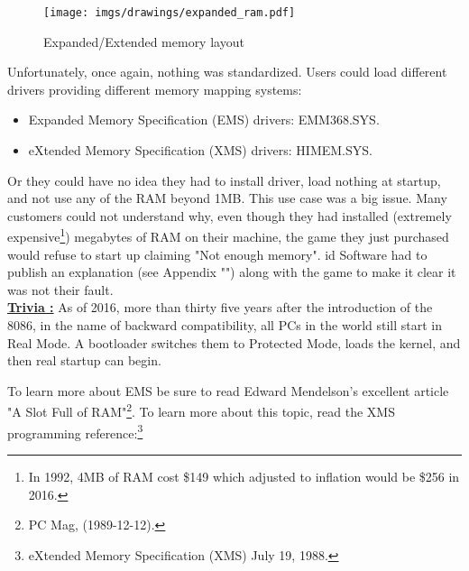 \documentclass[book.tex]{subfiles}
\begin{document}
\begin{figure}[H]
\centering
\texttt{[image: imgs/drawings/expanded\_ram.pdf]}
\caption{Expanded/Extended memory layout}
\label{fig:ems_xms_layout}
\end{figure}
Unfortunately, once again, nothing was standardized. Users could load different drivers providing different memory mapping systems:
\begin{itemize}
\item Expanded Memory Specification (EMS) drivers: EMM368.SYS.
\item eXtended Memory Specification (XMS) drivers: HIMEM.SYS.
\end{itemize}

Or they could have no idea they had to install driver, load nothing at startup, and not use any of the RAM beyond 1MB. This use case was a big issue. Many customers could not understand why, even though they had installed (extremely expensive\footnote{In 1992, 4MB of RAM cost \$149 which adjusted to inflation would be \$256 in 2016.}) megabytes of RAM on their machine, the game they just purchased would refuse to start up claiming "Not enough memory". id Software had to publish an explanation (see Appendix "") along with the game to make it clear it was not their fault.\\

\textbf{\underline{Trivia :}}  As of 2016, more than thirty five years after the introduction of the 8086, in the name of backward compatibility, all PCs in the world still start in Real Mode. A bootloader switches them to Protected Mode, loads the kernel, and then real startup can begin.

\bigskip
To learn more about EMS be sure to read Edward Mendelson's excellent article "A Slot Full of RAM"\footnote{PC Mag, (1989-12-12).}. To learn more about this topic, read the XMS programming reference:\footnote{eXtended Memory Specification (XMS) July 19, 1988.}\\
\par
\end{document}
